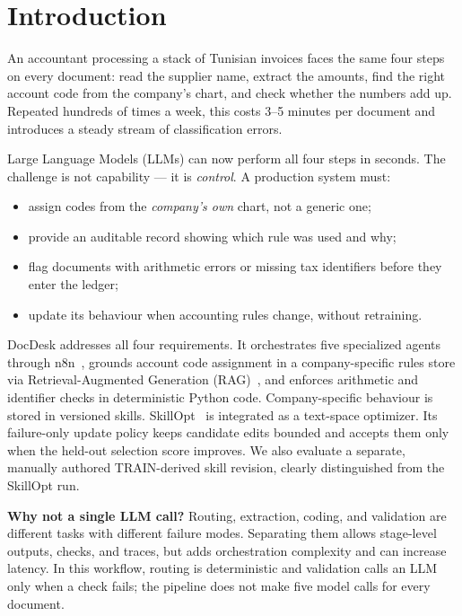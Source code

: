 \section{Introduction}
\label{sec:intro}

An accountant processing a stack of Tunisian invoices faces the same four steps
on every document: read the supplier name, extract the amounts, find the right
account code from the company's chart, and check whether the numbers add up.
Repeated hundreds of times a week, this costs 3–5 minutes per document and
introduces a steady stream of classification errors.

Large Language Models (LLMs) can now perform all four steps in seconds. The challenge
is not capability — it is \textit{control}. A production system must:

\begin{itemize}[leftmargin=*, itemsep=2pt]
  \item assign codes from the \emph{company's own} chart, not a generic one;
  \item provide an auditable record showing which rule was used and why;
  \item flag documents with arithmetic errors or missing tax identifiers before
        they enter the ledger;
  \item update its behaviour when accounting rules change, without retraining.
\end{itemize}

DocDesk addresses all four requirements. It orchestrates five specialized agents
through n8n~\cite{n8n2024}, grounds account code assignment in a company-specific
rules store via Retrieval-Augmented Generation (RAG)~\cite{lewis2020rag}, and
enforces arithmetic and identifier checks in deterministic Python code.
Company-specific behaviour is stored in versioned skills. SkillOpt~\cite{skillopt2024}
is integrated as a text-space optimizer. Its failure-only update policy keeps
candidate edits bounded and accepts them only when the held-out selection score
improves. We also evaluate a separate, manually authored TRAIN-derived skill
revision, clearly distinguished from the SkillOpt run.

\textbf{Why not a single LLM call?}
Routing, extraction, coding, and validation are different tasks with different
failure modes. Separating them allows stage-level outputs, checks, and traces,
but adds orchestration complexity and can increase latency. In this workflow,
routing is deterministic and validation calls an LLM only when a check fails;
the pipeline does not make five model calls for every document.

